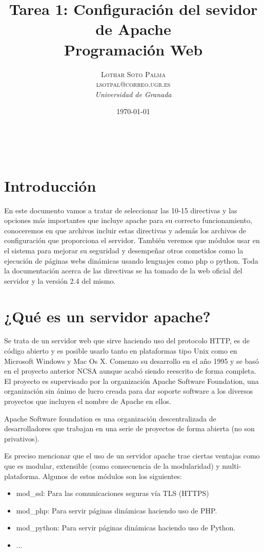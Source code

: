 \documentclass[a4paper, 11pt]{article} %
\title{\textbf{Tarea 1: Configuración del sevidor de Apache}\\ %
\vspace{20 pt}
Programación Web} %
\author{\textsc{Lothar Soto Palma\\
lsotpal@correo.ugr.es} %
\\{\textit{Universidad de Granada}}} %
\date{\today} %
\makeatletter
\renewcommand{\maketitle}{ %
\begin{center} %
{\Huge\@title} %
\end{center}

\vspace{20pt} %

\begin{flushright} %
{\large\@author} %
\\\@date %

\vspace{40pt} %
\end{flushright}
\renewcommand{\baselinestretch}{0.5}

}
\makeatother
\begin{document}
\maketitle
\tableofcontents
\newpage
\section{Introducción}
En este documento vamos a tratar de seleccionar las 10-15 directivas y las opciones más importantes que incluye apache para su correcto funcionamiento, conoceremos en que archivos incluir estas directivas y además los archivos de configuración que proporciona el servidor. También veremos que módulos usar en el sistema para mejorar su seguridad y desempeñar otros cometidos como la ejecución de páginas webs dinámicas usando lenguajes como php o python. Toda la documentación acerca de las directivas se ha tomado de la web oficial del servidor y la versión 2.4 del mismo.
\section{¿Qué es un servidor apache?}
Se trata de un servidor web que sirve haciendo uso del protocolo HTTP, es de código abierto y es posible usarlo tanto en plataformas tipo Unix como en Microsoft Windows y Mac Os X. Comenzo su desarrollo en el año 1995 y se basó en el proyecto anterior NCSA aunque acabó siendo reescrito de forma completa. El proyecto es supervisado por la organización Apache Software Foundation, una organización sin ánimo de lucro creada para dar soporte software a los diversos proyectos que incluyen el nombre de Apache en ellos. \cite{url1}

Apache Software foundation es una organización descentralizada de desarrolladores que trabajan en una serie de proyectos de forma abierta (no son privativos).\cite{url2} 

Es preciso mencionar que el uso de un servidor apache trae ciertas ventajas como que es modular, extensible (como consecuencia de la modularidad) y multi-plataforma.\cite{url1} Algunos de estos módulos son los siguientes:
\begin{itemize}
	\item mod\_ssl: Para las comunicaciones seguras vía TLS (HTTPS)
	\item mod\_php: Para servir páginas dinámicas haciendo uso de PHP.
	\item mod\_python: Para servir páginas dinámicas haciendo uso de Python.
	\item ...
\end{itemize}
\end{document}
